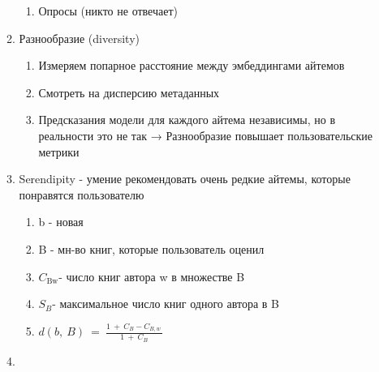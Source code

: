 \documentclass[a4paper, 12pt]{article}
\begin{document}
\begin{enumerate}
\begin{enumerate}
\begin{enumerate}
    \item
      
      Опросы (никто не отвечает)
      
    \end{enumerate}
  \item
    
    Разнообразие (diversity)
    

    \begin{enumerate}
    \def\labelenumiii{\roman{enumiii}.}
    \item
      
      Измеряем попарное расстояние между эмбеддингами айтемов
      
    \item
      
      Смотреть на дисперсию метаданных
      
    \item
      
      Предсказания модели для каждого айтема независимы, но в реальности
      это не так → Разнообразие повышает пользовательские метрики
      
    \end{enumerate}
  \item
    
    Serendipity - умение рекомендовать очень редкие айтемы, которые
    понравятся пользователю
    

    \begin{enumerate}
    \def\labelenumiii{\roman{enumiii}.}
    \item
      
      b - новая
      
    \item
      
      B - мн-во книг, которые пользователь оценил
      
    \item
      
      \(C_{\text{Bw}}\)- число книг автора w в множестве B
      
    \item
      
      \(S_{B}\)- максимальное число книг одного автора в B
      
    \item
      
      \(d(b,\ B)\  = \ \frac{1\  + \ C_{B} - C_{B,w\ }}{1\  + \ C_{B}}\)
      
    \end{enumerate}
  \item
    

\end{enumerate}
\end{enumerate}
\end{document}
